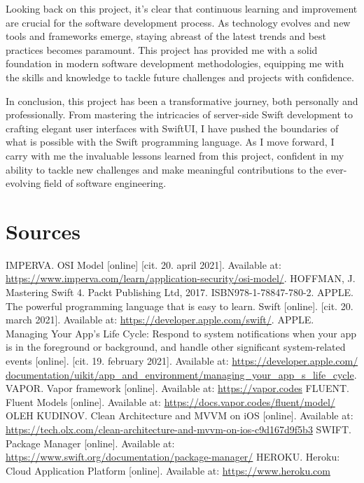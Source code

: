 \documentclass[
  biblatex = false,
  language=english,
  figures=false,
  sourcecodes,
  glossaries,
  index
]{kidiplom}
\begin{document}
\begin{kiconclusions}
Looking back on this project, it's clear that continuous learning and improvement are crucial for the software development process. As technology evolves and new tools and frameworks emerge, staying abreast of the latest trends and best practices becomes paramount. This project has provided me with a solid foundation in modern software development methodologies, equipping me with the skills and knowledge to tackle future challenges and projects with confidence.

In conclusion, this project has been a transformative journey, both personally and professionally. From mastering the intricacies of server-side Swift development to crafting elegant user interfaces with SwiftUI, I have pushed the boundaries of what is possible with the Swift programming language. As I move forward, I carry with me the invaluable lessons learned from this project, confident in my ability to tackle new challenges and make meaningful contributions to the ever-evolving field of software engineering.

\end{kiconclusions}


\appendix

\section{Sources} \label{sec:ObsahData}

\begin{thebibliography}{9}
 \uppercase{Imperva.} OSI Model [online] [cit. 20. april 2021]. Available at: \url{https://www.imperva.com/learn/application-security/osi-model/}.
 \uppercase{Hoffman, J.} Mastering Swift 4. Packt Publishing Ltd, 2017. ISBN978-1-78847-780-2.
 \uppercase{Apple.} The powerful programming language that is easy to learn. Swift [online]. [cit. 20. march 2021]. Available at: \url{https://developer.apple.com/swift/}.
 \uppercase{Apple.} Managing Your App’s Life Cycle: Respond to system notifications when your app is in the foreground or background, and handle other significant system-related events [online]. [cit. 19. february 2021]. Available at: \url{https://developer.apple.com/ documentation/uikit/app_and_environment/managing_your_app_s_life_cycle}.
 \uppercase{Vapor.} Vapor framework [online]. Available at: \url{https://vapor.codes}
 \uppercase{Fluent.} Fluent Models [online]. Available at: \url{https://docs.vapor.codes/fluent/model/}
 \uppercase{Oleh Kudinov.} Clean Architecture and MVVM on iOS [online]. Available at: \url{https://tech.olx.com/clean-architecture-and-mvvm-on-ios-c9d167d9f5b3}
 \uppercase{Swift.} Package Manager [online]. Available at: \url{https://www.swift.org/documentation/package-manager/}
 \uppercase{Heroku.} Heroku: Cloud Application Platform [online]. Available at: \url{https://www.heroku.com}
\end{thebibliography}

\end{document}
